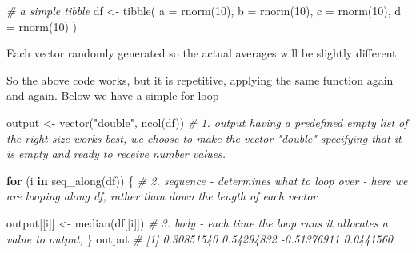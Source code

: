 \documentclass[
]{book}
\newenvironment{Shaded}{\begin{snugshade}}{\end{snugshade}}
\newcommand{\AttributeTok}[1]{\textcolor[rgb]{0.77,0.63,0.00}{#1}}
\newcommand{\CommentTok}[1]{\textcolor[rgb]{0.56,0.35,0.01}{\textit{#1}}}
\newcommand{\ControlFlowTok}[1]{\textcolor[rgb]{0.13,0.29,0.53}{\textbf{#1}}}
\newcommand{\DecValTok}[1]{\textcolor[rgb]{0.00,0.00,0.81}{#1}}
\newcommand{\FunctionTok}[1]{\textcolor[rgb]{0.00,0.00,0.00}{#1}}
\newcommand{\NormalTok}[1]{#1}
\newcommand{\OtherTok}[1]{\textcolor[rgb]{0.56,0.35,0.01}{#1}}
\newcommand{\SpecialCharTok}[1]{\textcolor[rgb]{0.00,0.00,0.00}{#1}}
\newcommand{\StringTok}[1]{\textcolor[rgb]{0.31,0.60,0.02}{#1}}
\begin{document}
\begin{Shaded}
\begin{Highlighting}[]
\CommentTok{\# a simple tibble}
\NormalTok{df }\OtherTok{\textless{}{-}} \FunctionTok{tibble}\NormalTok{(}
  \AttributeTok{a =}  \FunctionTok{rnorm}\NormalTok{(}\DecValTok{10}\NormalTok{),}
  \AttributeTok{b =}  \FunctionTok{rnorm}\NormalTok{(}\DecValTok{10}\NormalTok{),}
  \AttributeTok{c =}  \FunctionTok{rnorm}\NormalTok{(}\DecValTok{10}\NormalTok{),}
  \AttributeTok{d =} \FunctionTok{rnorm}\NormalTok{(}\DecValTok{10}\NormalTok{)}
\NormalTok{)}
\end{Highlighting}
\end{Shaded}

Each vector randomly generated so the actual averages will be slightly different

\begin{Shaded}
\end{Shaded}

So the above code works, but it is repetitive, applying the same function again and again. Below we have a simple for loop

\begin{Shaded}
\begin{Highlighting}[]
\NormalTok{output }\OtherTok{\textless{}{-}} \FunctionTok{vector}\NormalTok{(}\StringTok{"double"}\NormalTok{, }\FunctionTok{ncol}\NormalTok{(df))  }\CommentTok{\# 1. output having a predefined empty list of the right size works best, we choose to make the vector "double" specifying that it is empty and ready to receive number values. }

\ControlFlowTok{for}\NormalTok{ (i }\ControlFlowTok{in} \FunctionTok{seq\_along}\NormalTok{(df)) \{            }\CommentTok{\# 2. sequence {-} determines what to loop over {-} here we are looping along df, rather than down the length of each vector}
  
\NormalTok{  output[[i]] }\OtherTok{\textless{}{-}} \FunctionTok{median}\NormalTok{(df[[i]])      }\CommentTok{\# 3. body {-} each time the loop runs it allocates a value to output, }
\NormalTok{\}}
\NormalTok{output}
\CommentTok{\# [1]  0.30851540  0.54294832 {-}0.51376911  0.0441560}
\end{Highlighting}
\end{Shaded}
\end{document}
